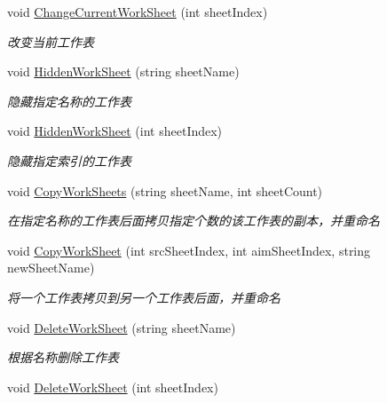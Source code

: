 \begin{DoxyCompactItemize}
void \hyperlink{class_x_c_l_net_tools_1_1_office_1_1_excel_handler_1_1_excel_helper_a626d1643db6d20fb63ba1166043dbc31}{Change\+Current\+Work\+Sheet} (int sheet\+Index)
\begin{DoxyCompactList}\small\item\em 改变当前工作表 \end{DoxyCompactList}\item 
void \hyperlink{class_x_c_l_net_tools_1_1_office_1_1_excel_handler_1_1_excel_helper_a9aaab80ccb46c62132165fd20790e3d0}{Hidden\+Work\+Sheet} (string sheet\+Name)
\begin{DoxyCompactList}\small\item\em 隐藏指定名称的工作表 \end{DoxyCompactList}\item 
void \hyperlink{class_x_c_l_net_tools_1_1_office_1_1_excel_handler_1_1_excel_helper_a96b25f831723c0a7b3522447af7c4336}{Hidden\+Work\+Sheet} (int sheet\+Index)
\begin{DoxyCompactList}\small\item\em 隐藏指定索引的工作表 \end{DoxyCompactList}\item 
void \hyperlink{class_x_c_l_net_tools_1_1_office_1_1_excel_handler_1_1_excel_helper_a628ecdd26ecf5c685ad7c2ab076cf36b}{Copy\+Work\+Sheets} (string sheet\+Name, int sheet\+Count)
\begin{DoxyCompactList}\small\item\em 在指定名称的工作表后面拷贝指定个数的该工作表的副本，并重命名 \end{DoxyCompactList}\item 
void \hyperlink{class_x_c_l_net_tools_1_1_office_1_1_excel_handler_1_1_excel_helper_a730eefd07f0b338d62000d58b6791ca1}{Copy\+Work\+Sheet} (int src\+Sheet\+Index, int aim\+Sheet\+Index, string new\+Sheet\+Name)
\begin{DoxyCompactList}\small\item\em 将一个工作表拷贝到另一个工作表后面，并重命名 \end{DoxyCompactList}\item 
void \hyperlink{class_x_c_l_net_tools_1_1_office_1_1_excel_handler_1_1_excel_helper_adc2bee7e717436f8bc586c5a0d149d3e}{Delete\+Work\+Sheet} (string sheet\+Name)
\begin{DoxyCompactList}\small\item\em 根据名称删除工作表 \end{DoxyCompactList}\item 
void \hyperlink{class_x_c_l_net_tools_1_1_office_1_1_excel_handler_1_1_excel_helper_abbd230c249186909fa47978177315cc5}{Delete\+Work\+Sheet} (int sheet\+Index)

\end{DoxyCompactItemize}
